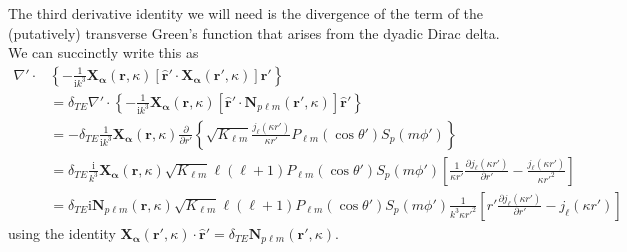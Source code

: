 \documentclass{article}
\begin{document}
The third derivative identity we will need is the divergence of the term of the (putatively) transverse Green's function that arises from the dyadic Dirac delta. We can succinctly write this as
\begin{equation}
\begin{split}
\nabla'\cdot&\left\{-\frac{1}{\mathrm{i}k^3}\mathbf{X}_{\bm{\alpha}}(\mathbf{r},\kappa)\left[\hat{\mathbf{r}}'\cdot\mathbf{X}_{\bm{\alpha}}(\mathbf{r}',\kappa)\right]\hat{\mathbf{r}}'\right\}\\
&= \delta_{TE}\nabla'\cdot\left\{-\frac{1}{\mathrm{i}k^3}\mathbf{X}_{\bm{\alpha}}(\mathbf{r},\kappa)\left[\hat{\mathbf{r}}'\cdot\mathbf{N}_{p\ell m}(\mathbf{r}',\kappa)\right]\hat{\mathbf{r}}'\right\}\\
&= -\delta_{TE}\frac{1}{\mathrm{i}k^3}\mathbf{X}_{\bm{\alpha}}(\mathbf{r},\kappa)\frac{\partial}{\partial r'}\left\{\sqrt{K_{\ell m}}\frac{j_\ell(\kappa r')}{\kappa r'}P_{\ell m}(\cos\theta')S_p(m\phi')\right\}\\
&= \delta_{TE}\frac{\mathrm{i}}{k^3}\mathbf{X}_{\bm{\alpha}}(\mathbf{r},\kappa)\sqrt{K_{\ell m}}\ell(\ell + 1)P_{\ell m}(\cos\theta')S_p(m\phi')\left[\frac{1}{\kappa r'}\frac{\partial j_\ell(\kappa r')}{\partial r'} - \frac{j_\ell(\kappa r')}{\kappa r'^2}\right]\\
&= \delta_{TE}\mathrm{i}\mathbf{N}_{p\ell m}(\mathbf{r},\kappa)\sqrt{K_{\ell m}}\ell(\ell + 1)P_{\ell m}(\cos\theta')S_p(m\phi')\frac{1}{k^3\kappa r'^2}\left[r'\frac{\partial j_\ell(\kappa r')}{\partial r'} - j_\ell(\kappa r')\right]
\end{split}
\end{equation}
using the identity $\mathbf{X}_{\bm{\alpha}}(\mathbf{r}',\kappa)\cdot\hat{\mathbf{r}}' = \delta_{TE}\mathbf{N}_{p\ell m}(\mathbf{r}',\kappa)$. 
\end{document}

